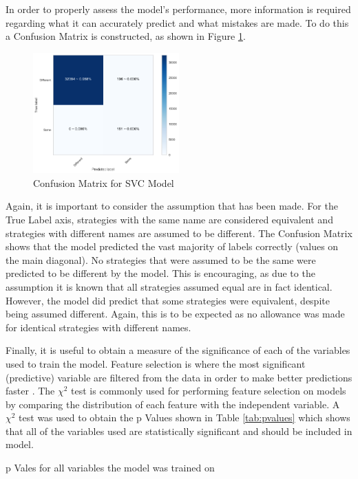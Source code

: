 In order to properly assess the model's performance, more information is required regarding what it can accurately predict and what mistakes are made.
To do this a Confusion Matrix is constructed, as shown in Figure \ref{fig:conf_matrix}.

\begin{figure}[htbp!]
    \centering
    \includegraphics[width=0.5\textwidth]{../img/ML/confusion_matrix.png}
    \caption{Confusion Matrix for SVC Model}
    \label{fig:conf_matrix}
\end{figure}

Again, it is important to consider the assumption that has been made.
For the True Label axis, strategies with the same name are considered equivalent and strategies with different names are assumed to be different.
The Confusion Matrix shows that the model predicted the vast majority of labels correctly (values on the main diagonal).
No strategies that were assumed to be the same were predicted to be different by the model.
This is encouraging, as due to the assumption it is known that all strategies assumed equal are in fact identical.
However, the model did predict that some strategies were equivalent, despite being assumed different.
Again, this is to be expected as no allowance was made for identical strategies with different names.

Finally, it is useful to obtain a measure of the significance of each of the variables used to train the model.
Feature selection is where the most significant (predictive) variable are filtered from the data in order to make better predictions faster \cite{Guyon2003}.
The $\chi^2$ test is commonly used for performing feature selection on models \cite{Forman2003} by comparing the distribution of each feature with the independent variable.
A $\chi^2$ test was used to obtain the p Values shown in Table \ref{tab:pvalues} which shows that all of the variables used are statistically significant and should be included in model.

\begin{table}[htbp!]
    \centering
    
    \caption{p Vales for all variables the model was trained on}
    \label{tab:pvalues}
\end{table}
